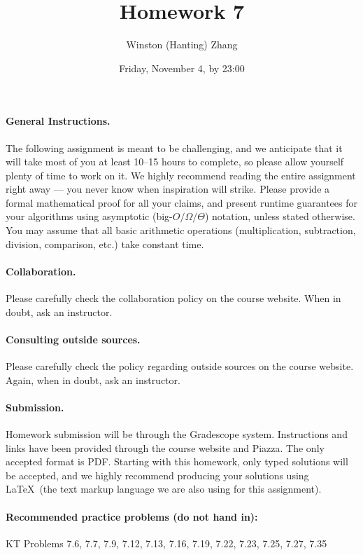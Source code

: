 \documentclass[10pt]{article}
\title{\bf Homework 7}
\author{Winston (Hanting) Zhang}
\date{Friday, November 4, by 23:00}
\begin{document}
\maketitle

\paragraph{General Instructions.} The following assignment is meant to be challenging, and we anticipate that it will take most of you at least 10--15 hours to complete, so please allow yourself plenty of time to work on it.
We highly recommend reading the entire assignment right away --- you never know when inspiration will strike.
Please provide a formal mathematical proof for all your claims, and  present runtime guarantees for your algorithms using asymptotic (big-$O/\Omega/\Theta$) notation, unless stated otherwise. You may assume that all basic arithmetic operations (multiplication, subtraction, division, comparison, etc.) take constant time. %

\paragraph{Collaboration.}  Please carefully check the collaboration policy on the course website. When in doubt, ask an instructor.

\paragraph{Consulting outside sources.} Please carefully check the policy regarding outside sources on the course website. Again, when in doubt, ask an instructor.

\paragraph{Submission.} Homework submission will be through the Gradescope system. Instructions and links have been provided through the course website and Piazza. The only accepted format is PDF. Starting with this homework, only typed solutions will be accepted, and we highly recommend producing your solutions using \LaTeX~(the text markup language we are also using for this assignment).

\paragraph{Recommended practice problems (do not hand in):} KT Problems 7.6, 7.7, 7.9, 7.12, 7.13, 7.16, 7.19, 7.22, 7.23, 7.25, 7.27, 7.35
\end{document}
